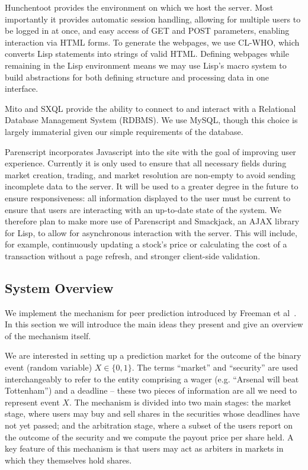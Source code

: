 \documentclass[10pt,a4paper]{article}
\theoremstyle{plain}
\theoremstyle{definition}
\begin{document}
Hunchentoot provides the environment on which we host the server. Most
importantly it provides automatic session handling, allowing for multiple users
to be logged in at once, and easy access of GET and POST parameters, enabling
interaction via HTML forms. To generate the webpages, we use CL-WHO, which
converts Lisp statements into strings of valid HTML. Defining webpages while
remaining in the Lisp environment means we may use Lisp's macro system to build
abstractions for both defining structure and processing data in one interface.

Mito and SXQL provide the ability to connect to and interact with a Relational
Database Management System (RDBMS). We use MySQL, though this choice is largely
immaterial given our simple requirements of the database.

Parenscript incorporates Javascript into the site with the goal of improving
user experience. Currently it is only used to ensure that all necessary fields
during market creation, trading, and market resolution are non-empty to avoid
sending incomplete data to the server. It will be used to a greater degree in
the future to ensure responsiveness: all information displayed to the user must
be current to ensure that users are interacting with an up-to-date state of the
system. We therefore plan to make more use of Parenscript and Smackjack, an
AJAX library for Lisp, to allow for asynchronous interaction with the server.
This will include, for example, continuously updating a stock's price or
calculating the cost of a transaction without a page refresh, and stronger
client-side validation.

\subsection{System Overview}

We implement the mechanism for peer prediction introduced by Freeman et
al~\cite{CODiPM}. In this section we will introduce the main ideas they present
and give an overview of the mechanism itself.

We are interested in setting up a prediction market for the outcome of the
binary event (random variable) $X \in \{0,1\}$. The terms ``market'' and
``security'' are used interchangeably to refer to the entity comprising a wager
(e.g. ``Arsenal will beat Tottenham'') and a deadline -- these two pieces of
information are all we need to represent event $X$. The mechanism is divided
into two main stages: the market stage, where users may buy and sell shares in
the securities whose deadlines have not yet passed; and the arbitration stage,
where a subset of the users report on the outcome of the security and we
compute the payout price per share held. A key feature of this mechanism is
that users may act as arbiters in markets in which they themselves hold shares.
\end{document}

